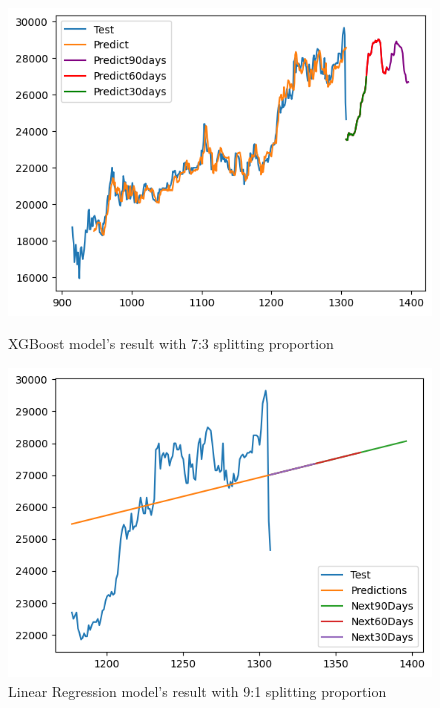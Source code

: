 \documentclass{ieeeojies}
\begin{document}
\begin{figure}[H]
    \centering
    \begin{minipage}{0.45\linewidth}
        \centering
    \includegraphics[width=\linewidth]{bibliography/diagram/XGBoost-ACB.png}
        \caption{XGBoost model’s result with 7:3 splitting proportion}
        \label{fig:XGBoost}
    \end{minipage}
    \hfill
    \begin{minipage}{0.45\linewidth}
        \centering
         \includegraphics[width=\linewidth]{bibliography/diagram/LR-ACB.png}
        \caption{Linear Regression model’s result with 9:1 splitting proportion}
        \label{fig:LR}
    \end{minipage}
\end{figure}
\end{document}

